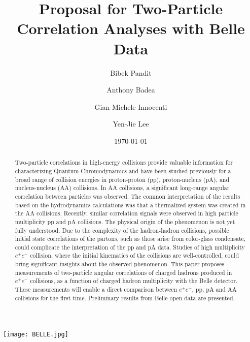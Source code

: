 \documentclass[%
preprint,
bibnotes,
]{revtex4-1}
\begin{document}
\texttt{[image: BELLE.jpg]}
\title{Proposal for Two-Particle Correlation Analyses with Belle Data}%

\author{Bibek Pandit}%
\author{Anthony Badea}%
\author{Gian Michele Innocenti}%
\author{Yen-Jie Lee}


\date{\today}%

\begin{abstract}
Two-particle correlations in high-energy collisions provide valuable information for characterizing Quantum Chromodynamics and have been studied previously for a broad range of collision energies in proton-proton (pp), proton-nucleus (pA), and nucleus-nucleus (AA) collisions. In AA collisions, a significant long-range angular correlation between particles was observed. The common interpretation of the results based on the hydrodynamics calculations was that a thermalized system was created in the AA collisions. Recently, similar correlation signals were observed in high particle multiplicity pp and pA collisions. The physical origin of the phenomenon is not yet fully understood. Due to the complexity of the hadron-hadron collisions, possible initial state correlations of the partons, such as those arise from color-glass condensate, could complicate the interpretation of the pp and pA data. Studies of high multiplicity $e^+e^-$ collision, where the initial kinematics of the collisions are well-controlled, could bring significant insights about the observed phenomenon. This paper proposes measurements of two-particle angular correlations of charged hadrons produced in $e^+e^-$ collisions, as a function of charged hadron multiplicity with the Belle detector. These measurements will enable a direct comparison between $e^+e^-$, pp, pA and AA collisions for the first time. Preliminary results from Belle open data are presented.
\end{abstract}
\end{document}
